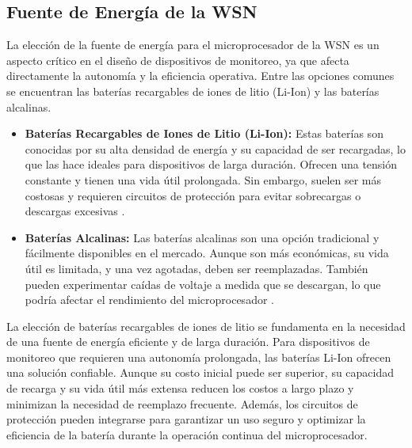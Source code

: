\subsection{Fuente de Energía de la WSN}
La elección de la fuente de energía para el microprocesador de la WSN es un aspecto crítico en el diseño de dispositivos de monitoreo, ya que afecta directamente la autonomía y la eficiencia operativa. Entre las opciones comunes se encuentran las baterías recargables de iones de litio (Li-Ion) y las baterías alcalinas.
\begin{itemize}
\item \textbf{Baterías Recargables de Iones de Litio (Li-Ion):} Estas baterías son conocidas por su alta densidad de energía y su capacidad de ser recargadas, lo que las hace ideales para dispositivos de larga duración. Ofrecen una tensión constante y tienen una vida útil prolongada. Sin embargo, suelen ser más costosas y requieren circuitos de protección para evitar sobrecargas o descargas excesivas \cite{litio}.
\item \textbf{Baterías Alcalinas:} Las baterías alcalinas son una opción tradicional y fácilmente disponibles en el mercado. Aunque son más económicas, su vida útil es limitada, y una vez agotadas, deben ser reemplazadas. También pueden experimentar caídas de voltaje a medida que se descargan, lo que podría afectar el rendimiento del microprocesador \cite{alcalinas}.
\end{itemize}
La elección de baterías recargables de iones de litio se fundamenta en la necesidad de una fuente de energía eficiente y de larga duración. Para dispositivos de monitoreo que requieren una autonomía prolongada, las baterías Li-Ion ofrecen una solución confiable. Aunque su costo inicial puede ser superior, su capacidad de recarga y su vida útil más extensa reducen los costos a largo plazo y minimizan la necesidad de reemplazo frecuente. Además, los circuitos de protección pueden integrarse para garantizar un uso seguro y optimizar la eficiencia de la batería durante la operación continua del microprocesador.

